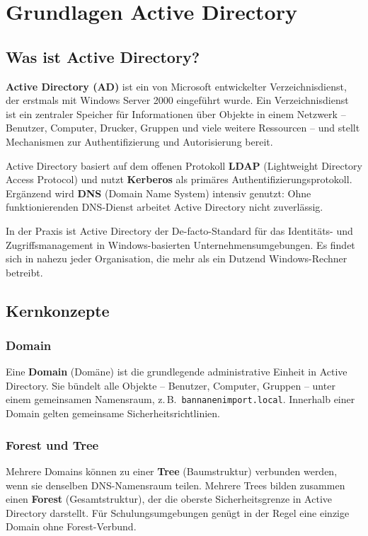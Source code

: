 \documentclass[11pt, oneside, numbers=noenddot]{scrbook}
\begin{document}

\tableofcontents
{}



\chapter{Grundlagen Active Directory}

\section{Was ist Active Directory?}
\textbf{Active Directory (AD)} ist ein von Microsoft entwickelter Verzeichnisdienst, der erstmals mit Windows Server 2000 eingeführt wurde. Ein Verzeichnisdienst ist ein zentraler Speicher für Informationen über Objekte in einem Netzwerk -- Benutzer, Computer, Drucker, Gruppen und viele weitere Ressourcen -- und stellt Mechanismen zur Authentifizierung und Autorisierung bereit.

Active Directory basiert auf dem offenen Protokoll \textbf{LDAP} (Lightweight Directory Access Protocol) und nutzt \textbf{Kerberos} als primäres Authentifizierungsprotokoll. Ergänzend wird \textbf{DNS} (Domain Name System) intensiv genutzt: Ohne funktionierenden DNS-Dienst arbeitet Active Directory nicht zuverlässig.

In der Praxis ist Active Directory der De-facto-Standard für das Identitäts- und Zugriffsmanagement in Windows-basierten Unternehmensumgebungen. Es findet sich in nahezu jeder Organisation, die mehr als ein Dutzend Windows-Rechner betreibt.

\section{Kernkonzepte}

\subsection{Domain}
Eine \textbf{Domain} (Domäne) ist die grundlegende administrative Einheit in Active Directory. Sie bündelt alle Objekte -- Benutzer, Computer, Gruppen -- unter einem gemeinsamen Namensraum, z.\,B.\ \texttt{bannanenimport.local}. Innerhalb einer Domain gelten gemeinsame Sicherheitsrichtlinien.

\subsection{Forest und Tree}
Mehrere Domains können zu einer \textbf{Tree} (Baumstruktur) verbunden werden, wenn sie denselben DNS-Namensraum teilen. Mehrere Trees bilden zusammen einen \textbf{Forest} (Gesamtstruktur), der die oberste Sicherheitsgrenze in Active Directory darstellt. Für Schulungsumgebungen genügt in der Regel eine einzige Domain ohne Forest-Verbund.
\end{document}
